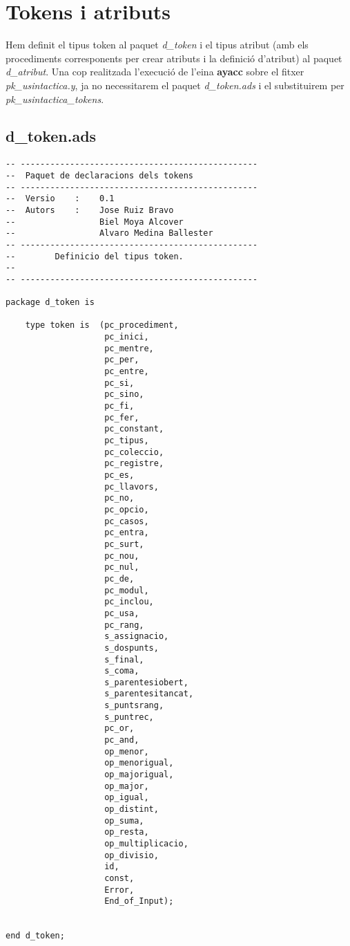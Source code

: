 \documentclass[10pt]{report}
\begin{document}
    
    \section{Tokens i atributs}
    Hem definit el tipus token al paquet \textit{d\_token} i el tipus atribut (amb els procediments corresponents per crear atributs i la definició d'atribut) al paquet \textit{d\_atribut}. Una cop realitzada l'execució de l'eina \textbf{ayacc} sobre el fitxer \textit{pk\_usintactica.y}, ja no necessitarem el paquet \textit{d\_token.ads} i el substituirem per \textit{pk\_usintactica\_tokens}.
    \subsection{d\_token.ads}
    \begin{lstlisting}[style=Ada]
-- ------------------------------------------------
--  Paquet de declaracions dels tokens
-- ------------------------------------------------
--  Versio    :    0.1
--  Autors    :    Jose Ruiz Bravo
--                 Biel Moya Alcover
--                 Alvaro Medina Ballester
-- ------------------------------------------------
--        Definicio del tipus token.
--
-- ------------------------------------------------

package d_token is

    type token is  (pc_procediment,
                    pc_inici,
                    pc_mentre,
                    pc_per,
                    pc_entre,
                    pc_si,
                    pc_sino,
                    pc_fi,
                    pc_fer,
                    pc_constant,
                    pc_tipus,
                    pc_coleccio,
                    pc_registre,
                    pc_es,
                    pc_llavors,
                    pc_no,
                    pc_opcio,
                    pc_casos,
                    pc_entra,
                    pc_surt,
                    pc_nou,
                    pc_nul,
                    pc_de,
                    pc_modul,
                    pc_inclou,
                    pc_usa,
                    pc_rang,
                    s_assignacio,
                    s_dospunts,
                    s_final,
                    s_coma,
                    s_parentesiobert,
                    s_parentesitancat,
                    s_puntsrang,
                    s_puntrec,
                    pc_or,
                    pc_and,
                    op_menor,
                    op_menorigual,
                    op_majorigual,
                    op_major,
                    op_igual,
                    op_distint,
                    op_suma,
                    op_resta,
                    op_multiplicacio,
                    op_divisio,
                    id,
                    const,
                    Error,
                    End_of_Input);
            
                    
end d_token;
    \end{lstlisting}
    \newpage
    
\end{document}
